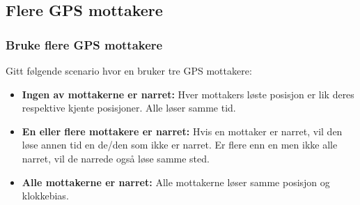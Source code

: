 \documentclass[xcolor=table]{beamer}
\begin{document}
\subsection{Flere GPS mottakere}
\begin{frame} 
  \frametitle{Bruke flere GPS mottakere}
  Gitt følgende scenario hvor en bruker tre GPS mottakere:
  \begin{itemize}
    \item \textbf{Ingen av mottakerne er narret:} Hver mottakers løste posisjon er lik deres respektive kjente posisjoner. Alle løser samme tid.
    \item \textbf{En eller flere mottakere er narret:} Hvis en mottaker er narret, vil den løse annen tid en de/den som ikke er narret. Er flere enn en men ikke alle narret, vil de narrede også løse samme sted.
    \item \textbf{Alle mottakerne er narret:} Alle mottakerne løser samme posisjon og klokkebias.
  \end{itemize}
\end{frame}
\end{document}
